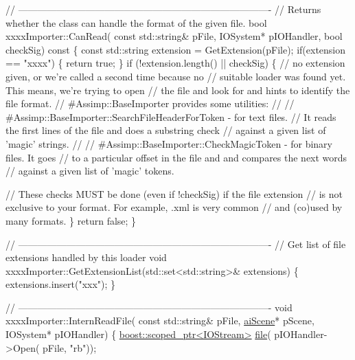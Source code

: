 \begin{DoxyCode}
\textcolor{comment}{// -------------------------------------------------------------------------------}
\textcolor{comment}{// Returns whether the class can handle the format of the given file. }
\textcolor{keywordtype}{bool} xxxxImporter::CanRead( \textcolor{keyword}{const} std::string& pFile, IOSystem* pIOHandler, 
    \textcolor{keywordtype}{bool} checkSig)\textcolor{keyword}{ const}
\textcolor{keyword}{}\{
    \textcolor{keyword}{const} std::string extension = GetExtension(pFile);
    \textcolor{keywordflow}{if}(extension == \textcolor{stringliteral}{"xxxx"}) \{
        \textcolor{keywordflow}{return} \textcolor{keyword}{true};
    \}
    \textcolor{keywordflow}{if} (!extension.length() || checkSig) \{
        \textcolor{comment}{// no extension given, or we're called a second time because no }
        \textcolor{comment}{// suitable loader was found yet. This means, we're trying to open }
        \textcolor{comment}{// the file and look for and hints to identify the file format.}
        \textcolor{comment}{// #Assimp::BaseImporter provides some utilities:}
        \textcolor{comment}{//}
        \textcolor{comment}{// #Assimp::BaseImporter::SearchFileHeaderForToken - for text files.}
        \textcolor{comment}{// It reads the first lines of the file and does a substring check}
        \textcolor{comment}{// against a given list of 'magic' strings.}
        \textcolor{comment}{//}
        \textcolor{comment}{// #Assimp::BaseImporter::CheckMagicToken - for binary files. It goes}
        \textcolor{comment}{// to a particular offset in the file and and compares the next words }
        \textcolor{comment}{// against a given list of 'magic' tokens.}

        \textcolor{comment}{// These checks MUST be done (even if !checkSig) if the file extension }
        \textcolor{comment}{// is not exclusive to your format. For example, .xml is very common }
        \textcolor{comment}{// and (co)used by many formats.}
    \}
    \textcolor{keywordflow}{return} \textcolor{keyword}{false};
\}

\textcolor{comment}{// -------------------------------------------------------------------------------}
\textcolor{comment}{// Get list of file extensions handled by this loader}
\textcolor{keywordtype}{void} xxxxImporter::GetExtensionList(std::set<std::string>& extensions)
\{
    extensions.insert(\textcolor{stringliteral}{"xxx"});
\}

\textcolor{comment}{// -------------------------------------------------------------------------------}
\textcolor{keywordtype}{void} xxxxImporter::InternReadFile( \textcolor{keyword}{const} std::string& pFile, 
    \hyperlink{structai_scene}{aiScene}* pScene, IOSystem* pIOHandler)
\{
    \hyperlink{classboost_1_1scoped__ptr}{boost::scoped\_ptr<IOStream>} \hyperlink{structfile}{file}( pIOHandler->Open( pFile, \textcolor{stringliteral}{"rb"}));


\end{DoxyCode}
